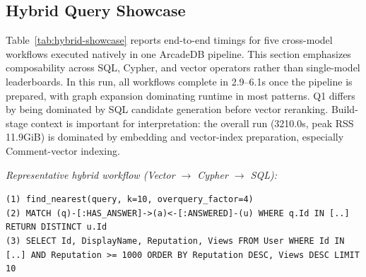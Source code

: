 \documentclass[sigconf, nonacm]{acmart}
\begin{document}
\subsection{Hybrid Query Showcase}

\begin{table}[tb]
  \centering
  \caption{Hybrid query workflows on Stack Overflow (ArcadeDB native pipeline, heap=16g).}
  \label{tab:hybrid-showcase}
  \small
\end{table}

Table~\ref{tab:hybrid-showcase} reports end-to-end timings for five cross-model workflows executed natively in one ArcadeDB pipeline. This section emphasizes composability across SQL, Cypher, and vector operators rather than single-model leaderboards. In this run, all workflows complete in 2.9--6.1s once the pipeline is prepared, with graph expansion dominating runtime in most patterns. Q1 differs by being dominated by SQL candidate generation before vector reranking. Build-stage context is important for interpretation: the overall run (3210.0s, peak RSS 11.9GiB) is dominated by embedding and vector-index preparation, especially Comment-vector indexing.

\par\smallskip\noindent\hspace*{1em}\textit{Representative hybrid workflow (Vector $\rightarrow$ Cypher $\rightarrow$ SQL):}
\begin{flushleft}
\small
\texttt{(1) find\_nearest(query, k=10, overquery\_factor=4)}\\[0.2em]
\texttt{(2) MATCH (q)-[:HAS\_ANSWER]->(a)<-[:ANSWERED]-(u)}\
\texttt{WHERE q.Id IN [..] RETURN DISTINCT u.Id}\\[0.2em]
\texttt{(3) SELECT Id, DisplayName, Reputation, Views}\
\texttt{FROM User WHERE Id IN [..]}\
\texttt{AND Reputation >= 1000}\
\texttt{ORDER BY Reputation DESC, Views DESC LIMIT 10}
\end{flushleft}
\end{document}
